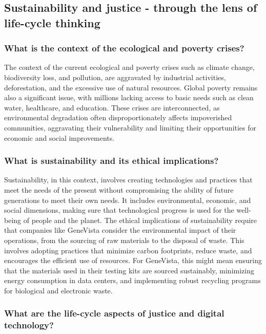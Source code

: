 \documentclass[a4paper]{article}
\begin{document}
\subsection{Sustainability and justice - through the lens of life-cycle thinking}

\subsubsection{What is the context of the ecological and poverty crises?}

The context of the current ecological and poverty crises such as climate change, biodiversity loss, and pollution, are aggravated by industrial activities, deforestation, and the excessive use of natural resources. Global poverty remains also a significant issue, with millions lacking access to basic needs such as clean water, healthcare, and education. These crises are interconnected, as environmental degradation often disproportionately affects impoverished communities, aggravating their vulnerability and limiting their opportunities for economic and social improvements.

\subsubsection{What is sustainability and its ethical implications?}

Sustainability, in this context, involves creating technologies and practices that meet the needs of the present without compromising the ability of future generations to meet their own needs. It includes environmental, economic, and social dimensions, making sure that technological progress is used for the well-being of people and the planet. The ethical implications of sustainability require that companies like GeneVista consider the environmental impact of their operations, from the sourcing of raw materials to the disposal of waste. This involves adopting practices that minimize carbon footprints, reduce waste, and encourages the efficient use of resources. For GeneVista, this might mean ensuring that the materials used in their testing kits are sourced sustainably, minimizing energy consumption in data centers, and implementing robust recycling programs for biological and electronic waste.

\subsubsection{What are the life-cycle aspects of justice and digital technology?}
\end{document}
